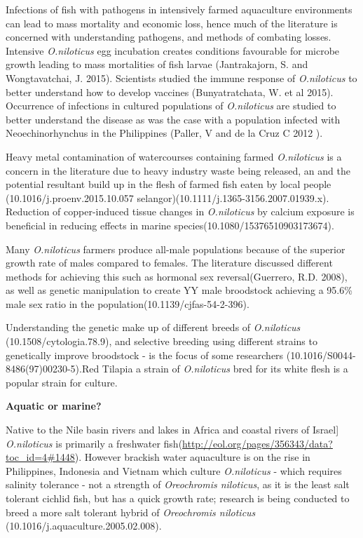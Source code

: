\documentclass[]{book}
\theoremstyle{definition}
\theoremstyle{definition}
\theoremstyle{definition}
\theoremstyle{remark}
\begin{document}
Infections of fish with pathogens in intensively farmed aquaculture
environments can lead to mass mortality and economic loss, hence much of
the literature is concerned with understanding pathogens, and methods of
combating losses. Intensive \emph{O.niloticus} egg incubation creates
conditions favourable for microbe growth leading to mass mortalities of
fish larvae (Jantrakajorn, S. and Wongtavatchai, J. 2015). Scientists
studied the immune response of \emph{O.niloticus} to better understand
how to develop vaccines (Bunyatratchata, W. et al 2015). Occurrence of
infections in cultured populations of \emph{O.niloticus} are studied to
better understand the disease as was the case with a population infected
with Neoechinorhynchus in the Philippines (Paller, V and de la Cruz C
2012 ).

Heavy metal contamination of watercourses containing farmed
\emph{O.niloticus} is a concern in the literature due to heavy industry
waste being released, an and the potential resultant build up in the
flesh of farmed fish eaten by local people (10.1016/j.proenv.2015.10.057
selangor)(10.1111/j.1365-3156.2007.01939.x). Reduction of copper-induced
tissue changes in \emph{O.niloticus} by calcium exposure is beneficial
in reducing effects in marine species(10.1080/15376510903173674).

Many \emph{O.niloticus} farmers produce all-male populations because of
the superior growth rate of males compared to females. The literature
discussed different methods for achieving this such as hormonal sex
reversal(Guerrero, R.D. 2008), as well as genetic manipulation to create
YY male broodstock achieving a 95.6\% male sex ratio in the
population(10.1139/cjfas-54-2-396).

Understanding the genetic make up of different breeds of
\emph{O.niloticus} (10.1508/cytologia.78.9), and selective breeding
using different strains to genetically improve broodstock - is the focus
of some researchers (10.1016/S0044-8486(97)00230-5).Red Tilapia a strain
of \emph{O.niloticus} bred for its white flesh is a popular strain for
culture.

\textbf{Aquatic or marine?}

Native to the Nile basin rivers and lakes in Africa and coastal rivers
of Israel{]} \emph{O.niloticus} is primarily a freshwater
fish(\url{http://eol.org/pages/356343/data?toc_id=4\#1448}). However
brackish water aquaculture is on the rise in Philippines, Indonesia and
Vietnam which culture \emph{O.niloticus} - which requires salinity
tolerance - not a strength of \emph{Oreochromis niloticus}, as it is the
least salt tolerant cichlid fish, but has a quick growth rate; research
is being conducted to breed a more salt tolerant hybrid of
\emph{Oreochromis niloticus} (10.1016/j.aquaculture.2005.02.008).
\end{document}
